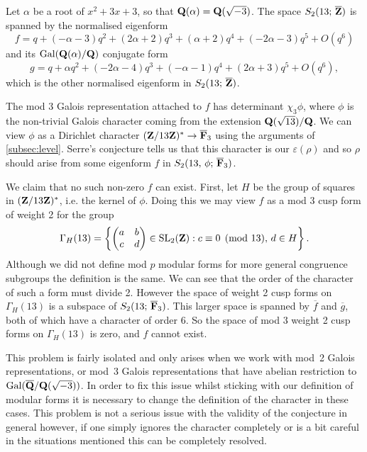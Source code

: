 \documentclass[a4paper,12pt]{article}
\begin{document}
\begin{ex}
Let $\alpha$ be a root of $x^2 + 3x+ 3$, so that $\mathbf{Q}(\alpha) = \mathbf{Q} (\sqrt{-3})$.
The space $S_2(13;\,\overline{\mathbf{Z}})$ is spanned by the normalised eigenform
\[
f= q + (-\alpha - 3)q^{2} + (2 \alpha + 2)q^{3} + (\alpha + 2)q^{4} + (-2 \alpha - 3)q^{5} + O(q^{6})
\]
and its $\operatorname{Gal}(\mathbf{Q}(\alpha)/\mathbf{Q})$ conjugate form
\[
g= q + \alpha q^{2} + (-2 \alpha - 4)q^{3} + (-\alpha - 1)q^{4} + (2 \alpha + 3)q^{5} + O(q^{6}),
\]
which is the other normalised eigenform in $S_2(13;\,\overline{\mathbf{Z}})$.

The mod 3 Galois representation attached to $f$ has determinant $\chi_3 \phi$, where $\phi$ is the non-trivial Galois character coming from the extension $\mathbf{Q}(\sqrt{13})/\mathbf{Q}$.
We can view $\phi$ as a Dirichlet character $(\mathbf{Z}/13\mathbf{Z})^* \to \overline{\mathbf{F}}_3$ using the arguments of \cref{subsec:level}.
Serre's conjecture tells us that this character is our $\varepsilon(\rho)$ and so $\rho$ should arise from some eigenform $f$ in $S_2(13,\,\phi;\,\overline{\mathbf{F}}_3)$.

We claim that no such non-zero $f$ can exist.
First, let $H$ be the group of squares in $(\mathbf{Z}/13\mathbf{Z})^*$, i.e. the kernel of $\phi$.
Doing this we may view $f$ as a mod $3$ cusp form of weight 2 for the group
\[
\Gamma_H(13) = \left\{ \begin{pmatrix} a & b\\ c & d\\ \end{pmatrix} \in \operatorname{SL}_2(\mathbf{Z}) : c \equiv 0 \pmod{13},\,d \in H\right\}.
\]
Although we did not define mod $p$ modular forms for more general congruence subgroups the definition is the same.
We can see that the order of the character of such a form must divide 2.
However the space of weight 2 cusp forms on $\Gamma_H(13)$ is a subspace of $S_2(13;\,\overline{\mathbf{F}}_3)$.
This larger space is spanned by $\overline{f}$ and $\overline{g}$, both of which have a character of order 6.
So the space of mod $3$ weight 2 cusp forms on $\Gamma_H(13)$ is zero, and $f$ cannot exist.
\end{ex}


This problem is fairly isolated and only arises when we work with mod~2 Galois representations, or mod~3 Galois representations that have abelian restriction to $\operatorname{Gal}(\overline{\mathbf{Q}}/\mathbf{Q}(\sqrt{-3}))$.
In order to fix this issue whilst sticking with our definition of modular forms it is necessary to change the definition of the character in these cases.
This problem is not a serious issue with the validity of the conjecture in general however, if one simply ignores the character completely or is a bit careful in the situations mentioned this can be completely resolved.
\end{document}
